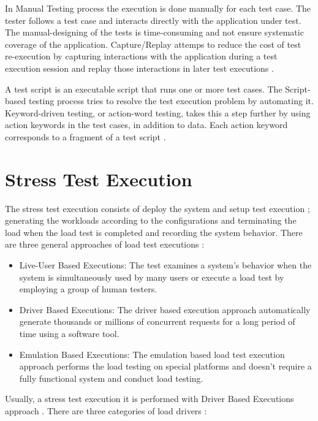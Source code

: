 \documentclass[espaco=umemeio,chapter=TITLE,twoside,openright]{abnt}
\begin{document}
In Manual Testing process the execution is done manually for each test case. The tester follows a test case and interacts directly with the application under test. The manual-designing of the tests is time-consuming and not ensure systematic coverage of the application. Capture/Replay attemps to reduce the cost of test re-execution by capturing interactions with the application during a test execution session and replay those interactions in later test executions \cite{utting2010practical}.

A test script is an executable script that runs one or more test cases. The Script-based testing process tries to resolve the test execution problem by automating it. Keyword-driven testing, or action-word testing, takes this a step further by using action keywords in the test cases, in addition to data. Each action keyword corresponds to a fragment of a test script \cite{utting2010practical}.


\section{Stress Test Execution}

The stress test execution  consists of deploy the system  and setup test execution ; generating the workloads according to the configurations and terminating the load when the load test is completed and recording the system behavior. There are three general approaches of load test executions \cite{Molyneaux2009}\cite{Jiang2010}:

\begin{itemize}
\item Live-User Based Executions: The test examines a system’s behavior when the system is simultaneously used by many users or execute a load test by employing a group of human testers.
\item Driver Based Executions: The driver based execution approach automatically generate thousands or millions of concurrent requests for a long period of time using a software tool.
\item Emulation Based Executions: The emulation based load test execution approach performs the load testing on special platforms and doesn't require a fully functional system and conduct load testing.
\end{itemize}

Usually, a stress test execution it is performed with Driver Based Executions approach \cite{Erinle2013} \cite{MohammadS.Obaidat} \cite{Wang2013}. There are three categories of load drivers \cite{Jiang2010}:
\end{document}
